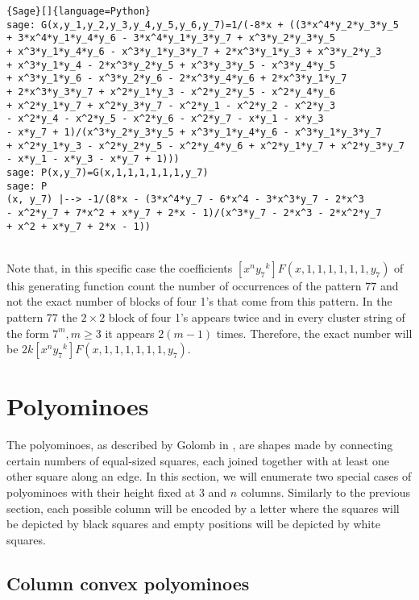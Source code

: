 \documentclass[12pt]{report}
\begin{document}
{{{
\begin{lstlisting}{Sage}[]{language=Python}
sage: G(x,y_1,y_2,y_3,y_4,y_5,y_6,y_7)=1/(-8*x + ((3*x^4*y_2*y_3*y_5 
+ 3*x^4*y_1*y_4*y_6 - 3*x^4*y_1*y_3*y_7 + x^3*y_2*y_3*y_5 
+ x^3*y_1*y_4*y_6 - x^3*y_1*y_3*y_7 + 2*x^3*y_1*y_3 + x^3*y_2*y_3
+ x^3*y_1*y_4 - 2*x^3*y_2*y_5 + x^3*y_3*y_5 - x^3*y_4*y_5 
+ x^3*y_1*y_6 - x^3*y_2*y_6 - 2*x^3*y_4*y_6 + 2*x^3*y_1*y_7 
+ 2*x^3*y_3*y_7 + x^2*y_1*y_3 - x^2*y_2*y_5 - x^2*y_4*y_6 
+ x^2*y_1*y_7 + x^2*y_3*y_7 - x^2*y_1 - x^2*y_2 - x^2*y_3 
- x^2*y_4 - x^2*y_5 - x^2*y_6 - x^2*y_7 - x*y_1 - x*y_3 
- x*y_7 + 1)/(x^3*y_2*y_3*y_5 + x^3*y_1*y_4*y_6 - x^3*y_1*y_3*y_7 
+ x^2*y_1*y_3 - x^2*y_2*y_5 - x^2*y_4*y_6 + x^2*y_1*y_7 + x^2*y_3*y_7 
- x*y_1 - x*y_3 - x*y_7 + 1)))
sage: P(x,y_7)=G(x,1,1,1,1,1,1,y_7)
sage: P
(x, y_7) |--> -1/(8*x - (3*x^4*y_7 - 6*x^4 - 3*x^3*y_7 - 2*x^3
- x^2*y_7 + 7*x^2 + x*y_7 + 2*x - 1)/(x^3*y_7 - 2*x^3 - 2*x^2*y_7 
+ x^2 + x*y_7 + 2*x - 1))
\end{lstlisting}} \quad \\


\noindent Note that, in this specific case the coefficients $[x^n {y_7}^k]F(x,1,1,1,1,1,1,y_7)$ of this generating function count the number of occurrences of the pattern $77$ and not the exact number of blocks of four 1's that come from this pattern. In the pattern $77$ the $2 \times 2$ block of four 1's appears twice and in every cluster string of the form $7^m, m \geq 3$ it appears $2(m-1)$ times. Therefore, the exact number will be $2k[x^n {y_7}^k]F(x,1,1,1,1,1,1,y_7)$.


\section{Polyominoes}

The polyominoes, as described by Golomb in \cite{G1996}, are shapes made by connecting certain numbers of equal-sized squares, each joined together with at least one other square along an edge.
In this section, we will enumerate two special cases of polyominoes with their height fixed at 3 and $n$ columns. Similarly to the previous section, each possible column will be encoded by a letter where the squares will be depicted by black squares and empty positions will be depicted by white squares. 

\subsection{Column convex polyominoes}

}}
\end{document}
